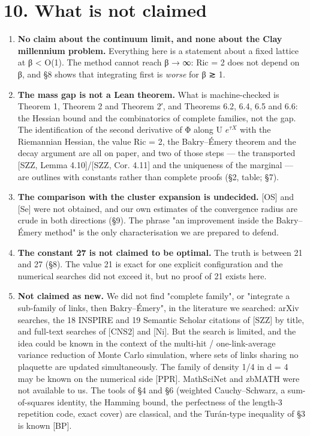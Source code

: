 \documentclass[11pt,a4paper]{article}
\theoremstyle{named}
\begin{document}
\section*{10. What is not claimed}
\begin{enumerate}
\item[1.] \textbf{No claim about the continuum limit, and none about the Clay millennium problem.} Everything here is a statement about a fixed lattice at β \textless{} O(1). The method cannot reach β → ∞: Ric = 2 does not depend on β, and §8 shows that integrating first is \textit{worse} for β ≳ 1.
\item[2.] \textbf{The mass gap is not a Lean theorem.} What is machine-checked is Theorem 1, Theorem 2 and Theorem 2′, and Theorems 6.2, 6.4, 6.5 and 6.6: the Hessian bound and the combinatorics of complete families, not the gap. The identification of the second derivative of Φ along U $e^{τX}$ with the Riemannian Hessian, the value Ric = 2, the Bakry–Émery theorem and the decay argument are all on paper, and two of those steps — the transported [SZZ, Lemma 4.10]/[SZZ, Cor. 4.11] and the uniqueness of the marginal — are outlines with constants rather than complete proofs (§2, table; §7).
\item[3.] \textbf{The comparison with the cluster expansion is undecided.} [OS] and [Se] were not obtained, and our own estimates of the convergence radius are crude in both directions (§9). The phrase "an improvement inside the Bakry–Émery method" is the only characterisation we are prepared to defend.
\item[4.] \textbf{The constant 27 is not claimed to be optimal.} The truth is between 21 and 27 (§8). The value 21 is exact for one explicit configuration and the numerical searches did not exceed it, but no proof of 21 exists here.
\item[5.] \textbf{Not claimed as new.} We did not find "complete family", or "integrate a sub-family of links, then Bakry–Émery", in the literature we searched: arXiv searches, the 18 INSPIRE and 19 Semantic Scholar citations of [SZZ] by title, and full-text searches of [CNS2] and [Ni]. But the search is limited, and the idea could be known in the context of the multi-hit / one-link-average variance reduction of Monte Carlo simulation, where sets of links sharing no plaquette are updated simultaneously. The family of density 1/4 in d = 4 may be known on the numerical side [PPR]. MathSciNet and zbMATH were not available to us. The tools of §4 and §6 (weighted Cauchy–Schwarz, a sum-of-squares identity, the Hamming bound, the perfectness of the length-3 repetition code, exact cover) are classical, and the Turán-type inequality of §3 is known [BP].

\end{enumerate}
\end{document}
